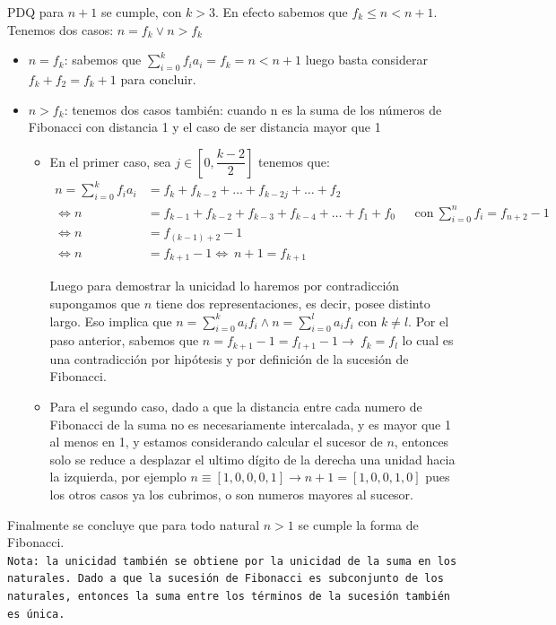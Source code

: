 \documentclass[letterpaper,10pt]{article}
\begin{document}
PDQ para $n+1$ se cumple, con $k>3$. En efecto sabemos que $f_{k} \leq n < n+1 $. Tenemos dos casos: $n=f_k \vee n>f_k $
\begin{itemize}
\item $n=f_k $: sabemos que $\sum_{i=0}^{k} f_i a_i = f_k = n < n+1$ luego basta considerar $f_{k} + f_2 = f_{k} + 1$ para concluir.
\item $n>f_k $: tenemos dos casos también: cuando n es la suma de los números de Fibonacci con distancia 1 y el caso de ser distancia mayor que 1
\begin{itemize}
\item En el primer caso, sea $j\in \left[0,\dfrac{k-2}{2}\right] $ tenemos que:
\begin{align*}
n = \sum_{i=0}^{k} f_i a_i &= f_k + f_{k-2} + \ldots + f_{k-2j} + \ldots + f_2\\
\Leftrightarrow n &= f_{k-1} + f_{k-2} + f_{k-3} + f_{k-4} + \ldots + f_{1} + f_{0}\ \ \ \ \ \ \  \textrm{con}\ \sum_{i=0}^{n}f_i = f_{n+2} -1 \\
\Leftrightarrow n &=f_{(k-1)+2} - 1\\
\Leftrightarrow n &=f_{k+1}-1 \Leftrightarrow\  n+1=f_{k+1}
\end{align*}

Luego para demostrar la unicidad lo haremos por contradicción supongamos que $n$ tiene dos representaciones, es decir, posee distinto largo. Eso implica que $n=\sum_{i=0}^{k}a_i f_i \wedge n=\sum_{i=0}^{l}a_i f_i $ con $k\neq l$. Por el paso anterior, sabemos que $n=f_{k+1} -1 = f_{l+1} -1 \rightarrow\ f_k = f_l $ lo cual es una contradicción por hipótesis y por definición de la sucesión de Fibonacci. 
\item Para el segundo caso, dado a que la distancia entre cada numero de Fibonacci de la suma no es necesariamente intercalada, y es mayor que 1 al menos en 1, y estamos considerando calcular el sucesor de $n$, entonces solo se reduce a desplazar el ultimo dígito de la derecha una unidad hacia la izquierda, por ejemplo $n \equiv [1, 0, 0, 0, 1] \rightarrow n+1 = [1,0,0,1,0]$ pues los otros casos ya los cubrimos, o son numeros mayores al sucesor.
\end{itemize}
\end{itemize}

Finalmente se concluye que para todo natural $n>1$ se cumple la forma de Fibonacci.\\

\texttt{Nota: la unicidad también se obtiene por la unicidad de la suma en los naturales. Dado a que la sucesión de Fibonacci es subconjunto de los naturales, entonces la suma entre los términos de la sucesión también es única.}\\
\end{document}
